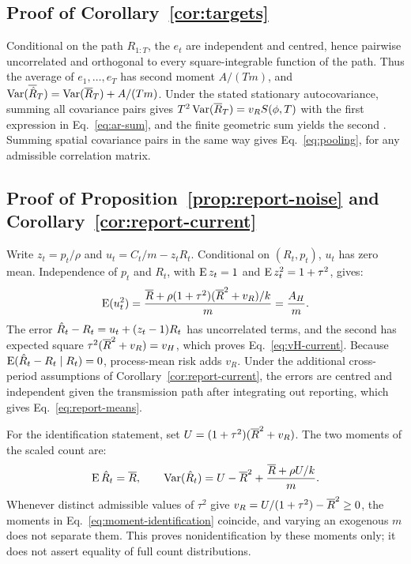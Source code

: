 \subsection{Proof of Corollary~\ref{cor:targets}}
\label{app:cor-targets}

Conditional on the path $R_{1:T}$, the $e_t$ are independent and centred, hence pairwise uncorrelated and orthogonal to every square-integrable function of the path. Thus the average of $e_1,\dots,e_T$ has second moment $A/(Tm)$, and $\operatorname{Var}(\overline{\hat R}_T)=\operatorname{Var}(\overline{R}_T)+A/(Tm)$. Under the stated stationary autocovariance, summing all covariance pairs gives $T^2\operatorname{Var}(\overline{R}_T)=v_RS(\phi,T)$ with the first expression in Eq.~\eqref{eq:ar-sum}, and the finite geometric sum yields the second \citep{hamilton1994time}. Summing spatial covariance pairs in the same way gives Eq.~\eqref{eq:pooling}, for any admissible correlation matrix.

\subsection{Proof of Proposition~\ref{prop:report-noise} and Corollary~\ref{cor:report-current}}
\label{app:prop2}

Write $z_t=p_t/\rho$ and $u_t=C_t/m-z_tR_t$. Conditional on $(R_t,p_t)$, $u_t$ has zero mean. Independence of $p_t$ and $R_t$, with $\operatorname{E} z_t=1$ and $\operatorname{E} z_t^2=1+\tau^2$, gives:
\begin{equation}
 \operatorname{E}(u_t^2)=\frac{\overline{R}+\rho(1+\tau^2)(\overline{R}^2+v_R)/k}{m}=\frac{A_H}{m}.
\end{equation}
The error $\hat R_t-R_t=u_t+(z_t-1)R_t$ has uncorrelated terms, and the second has expected square $\tau^2(\overline{R}^2+v_R)=v_H$, which proves Eq.~\eqref{eq:vH-current}. Because $\operatorname{E}(\hat R_t-R_t\mid R_t)=0$, process-mean risk adds $v_R$. Under the additional cross-period assumptions of Corollary~\ref{cor:report-current}, the errors are centred and independent given the transmission path after integrating out reporting, which gives Eq.~\eqref{eq:report-means}.

For the identification statement, set $U=(1+\tau^2)(\overline{R}^2+v_R)$. The two moments of the scaled count are:
\begin{equation}
 \operatorname{E}\hat R_t=\overline{R},\qquad
 \operatorname{Var}(\hat R_t)=U-\overline{R}^2+\frac{\overline{R}+\rho U/k}{m}.
 \label{eq:moment-identification}
\end{equation}
Whenever distinct admissible values of $\tau^2$ give $v_R=U/(1+\tau^2)-\overline{R}^2\ge0$, the moments in Eq.~\eqref{eq:moment-identification} coincide, and varying an exogenous $m$ does not separate them. This proves nonidentification by these moments only; it does not assert equality of full count distributions.

